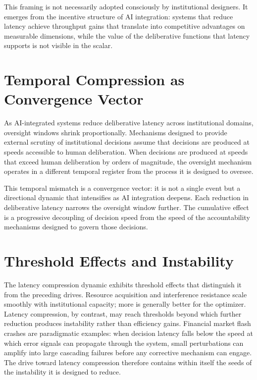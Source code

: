 \documentclass[12pt, oneside]{book}
\theoremstyle{plain}
\theoremstyle{definition}
\theoremstyle{remark}
\theoremstyle{definition}
\begin{document}
This framing is not necessarily adopted consciously by institutional designers. It
emerges from the incentive structure of AI integration: systems that reduce latency
achieve throughput gains that translate into competitive advantages on measurable
dimensions, while the value of the deliberative functions that latency supports is
not visible in the scalar.

\section{Temporal Compression as Convergence Vector}

As AI-integrated systems reduce deliberative latency across institutional domains,
oversight windows shrink proportionally. Mechanisms designed to provide external
scrutiny of institutional decisions assume that decisions are produced at speeds
accessible to human deliberation. When decisions are produced at speeds that exceed
human deliberation by orders of magnitude, the oversight mechanism operates in a
different temporal register from the process it is designed to oversee.

This temporal mismatch is a convergence vector: it is not a single event but a
directional dynamic that intensifies as AI integration deepens. Each reduction in
deliberative latency narrows the oversight window further. The cumulative effect is
a progressive decoupling of decision speed from the speed of the accountability
mechanisms designed to govern those decisions.

\section{Threshold Effects and Instability}

The latency compression dynamic exhibits threshold effects that distinguish it from
the preceding drives. Resource acquisition and interference resistance scale smoothly
with institutional capacity; more is generally better for the optimizer. Latency
compression, by contrast, may reach thresholds beyond which further reduction
produces instability rather than efficiency gains. Financial market flash crashes
are paradigmatic examples: when decision latency falls below the speed at which
error signals can propagate through the system, small perturbations can amplify
into large cascading failures before any corrective mechanism can engage. The drive
toward latency compression therefore contains within itself the seeds of the
instability it is designed to reduce.
\end{document}
